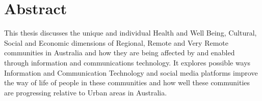 \chapter{Abstract}

This thesis discusses the unique and individual Health and Well Being, Cultural, Social and Economic dimensions of  Regional, Remote and Very Remote communities in Australia and how they are being affected by and enabled through information and communications technology. It explores possible ways Information and Communication Technology and social media platforms improve the way of life of people in these communities and how well these communities are progressing relative to Urban areas in Australia.